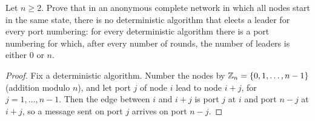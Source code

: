 \begin{exercisebox}
\begin{exercise}\label{ex:anonymous-0908}\label{thm:anonymous-0908}
    Let $n \geq 2$. Prove that in an anonymous complete network in which all nodes start in the same
    state, there is no deterministic algorithm that elects a leader for every port numbering: for
    every deterministic algorithm there is a port numbering for which, after every number of rounds,
    the number of leaders is either $0$ or $n$.
\end{exercise}
\tcblower
\begin{proof}
%
%
    Fix a deterministic algorithm. Number the nodes by $\mathbb{Z}_n = \left\lbrace0, 1, \dots, n-1\right\rbrace$
    (addition modulo $n$), and let port $j$ of node $i$ lead to node $i + j$, for $j = 1, \dots, n-1$.
    Then the edge between $i$ and $i + j$ is port $j$ at $i$ and port $n - j$ at $i + j$, so a
    message sent on port $j$ arrives on port $n - j$.


\end{proof}
\end{exercisebox}
